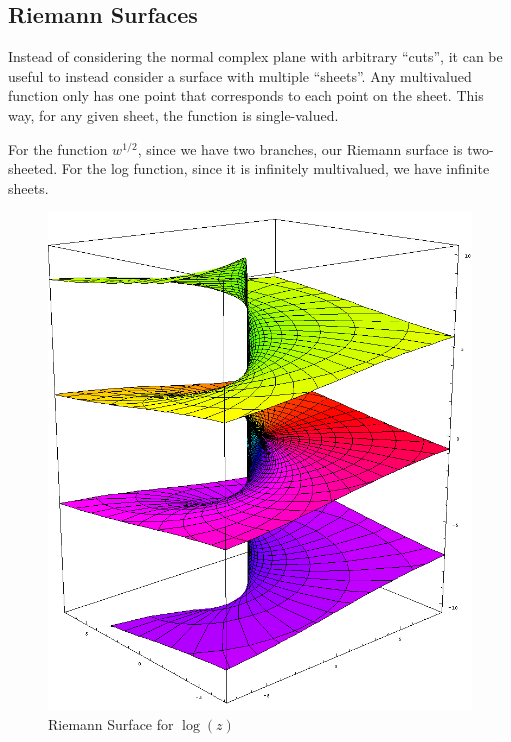     \subsection{Riemann Surfaces}
    Instead of considering the normal complex plane with arbitrary ``cuts'',
    it can be useful to instead consider a surface with multiple ``sheets''.
    Any multivalued function only has one point that corresponds to each
    point on the sheet. This way, for any given sheet, the function is
    single-valued.

    For the function $w^{1/2}$, since we have two branches, our Riemann
    surface is two-sheeted. For the log function, since it is infinitely
    multivalued, we have infinite sheets.

    \begin{figure}[H]
        \centering
        \includegraphics[scale=0.3]{./img/Riemann_surface_log.png}
        \caption{Riemann Surface for $\log(z)$}
    \end{figure}

